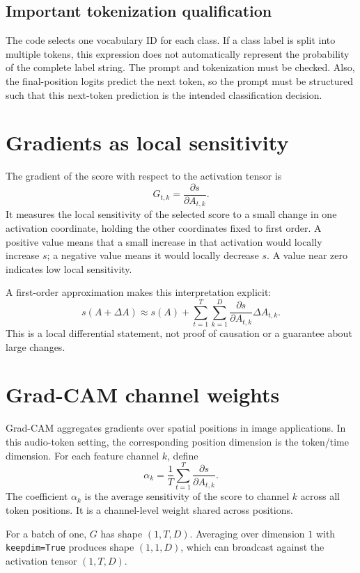 \documentclass[11pt,a4paper]{article}
\begin{document}
\subsection{Important tokenization qualification}
The code selects one vocabulary ID for each class. If a class label is split into multiple tokens, this expression does not automatically represent the probability of the complete label string. The prompt and tokenization must be checked. Also, the final-position logits predict the next token, so the prompt must be structured such that this next-token prediction is the intended classification decision.

\section{Gradients as local sensitivity}
The gradient of the score with respect to the activation tensor is
\[
G_{t,k}=\frac{\partial s}{\partial A_{t,k}}.
\]
It measures the local sensitivity of the selected score to a small change in one activation coordinate, holding the other coordinates fixed to first order. A positive value means that a small increase in that activation would locally increase $s$; a negative value means it would locally decrease $s$. A value near zero indicates low local sensitivity.

A first-order approximation makes this interpretation explicit:
\[
s(A+\Delta A)\approx s(A)+
\sum_{t=1}^{T}\sum_{k=1}^{D}
\frac{\partial s}{\partial A_{t,k}}\Delta A_{t,k}.
\]
This is a local differential statement, not proof of causation or a guarantee about large changes.

\section{Grad-CAM channel weights}
Grad-CAM aggregates gradients over spatial positions in image applications. In this audio-token setting, the corresponding position dimension is the token/time dimension. For each feature channel $k$, define
\[
\alpha_k=\frac{1}{T}\sum_{t=1}^{T}
\frac{\partial s}{\partial A_{t,k}}.
\]
The coefficient $\alpha_k$ is the average sensitivity of the score to channel $k$ across all token positions. It is a channel-level weight shared across positions.

For a batch of one, $G$ has shape $(1,T,D)$. Averaging over dimension $1$ with \texttt{keepdim=True} produces shape $(1,1,D)$, which can broadcast against the activation tensor $(1,T,D)$.
\end{document}
